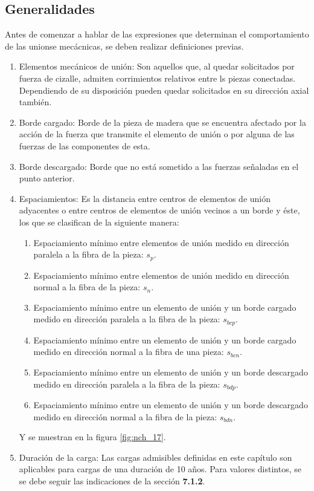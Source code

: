 \subsection{Generalidades}
Antes de comenzar a hablar de las expresiones que determinan el comportamiento de las unionse mecácnicas, se deben realizar definiciones previas. 
\begin{enumerate}
		\item Elementos mecánicos de unión: Son aquellos que, al quedar solicitados por fuerza de cizalle, admiten corrimientos relativos entre ls piezas conectadas. Dependiendo de su disposición pueden quedar solicitados en su dirección axial también.
		\item Borde cargado: Borde de la pieza de madera que se encuentra afectado por la acción de la fuerza que transmite el elemento de unión o por alguna de las fuerzas de las componentes de esta.
		\item Borde descargado: Borde que no está sometido a las fuerzas señaladas en el punto anterior.
		\item Espaciamientos: Es la distancia entre centros de elementos de unión adyacentes o entre centros de elementos de unión vecinos a un borde y éste, los que se clasifican de la siguiente manera:
		\begin{enumerate}
			\item Espaciamiento mínimo entre elementos de unión medido en dirección paralela a la fibra de la pieza: $s_p$.
			\item Espaciamiento mínimo entre elementos de unión medido en dirección normal a la fibra de la pieza: $s_n$.
			\item Espaciamiento mínimo entre un elemento de unión y un borde cargado medido en dirección paralela a la fibra de la pieza: $s_{bcp}$.
			\item Espaciamiento mínimo entre un elemento de unión y un borde cargado medido en dirección normal a la fibra de una pieza: $s_{bcn}$.
			\item Espaciamiento mínimo entre un elemento de unión y un borde descargado medido en dirección paralela a la fibra de la pieza: $s_{bdp}$.
			\item Espaciamiento mínimo entre un elemento de unión y un borde descargado medido en dirección normal a la fibra de la pieza: $s_{bdn}$.
		\end{enumerate}
		Y se muestran en la figura \ref{fig:nch_17}.
		\item Duración de la carga: Las cargas admisibles definidas en este capítulo son aplicables para cargas de una duración de 10 años. Para valores distintos, se se debe seguir las indicaciones de la sección \textbf{7.1.2}.

\end{enumerate}

